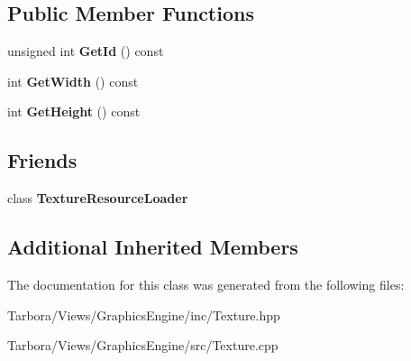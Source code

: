 \subsection*{Public Member Functions}
\begin{DoxyCompactItemize}
\item 
\mbox{\label{classTarbora_1_1Texture_a4a267559fb158d84fb818b678d08cd4a}} 
unsigned int {\bfseries Get\+Id} () const
\item 
\mbox{\label{classTarbora_1_1Texture_ad5c80665c136cedb3f6309a107301d25}} 
int {\bfseries Get\+Width} () const
\item 
\mbox{\label{classTarbora_1_1Texture_ada12e9f0bf570b36ba98ba90e9ff1d11}} 
int {\bfseries Get\+Height} () const
\end{DoxyCompactItemize}
\subsection*{Friends}
\begin{DoxyCompactItemize}
\item 
\mbox{\label{classTarbora_1_1Texture_a2894731fd152f0c4cbf3185a7212b8b7}} 
class {\bfseries Texture\+Resource\+Loader}
\end{DoxyCompactItemize}
\subsection*{Additional Inherited Members}


The documentation for this class was generated from the following files\+:\begin{DoxyCompactItemize}
\item 
Tarbora/\+Views/\+Graphics\+Engine/inc/Texture.\+hpp\item 
Tarbora/\+Views/\+Graphics\+Engine/src/Texture.\+cpp\end{DoxyCompactItemize}
